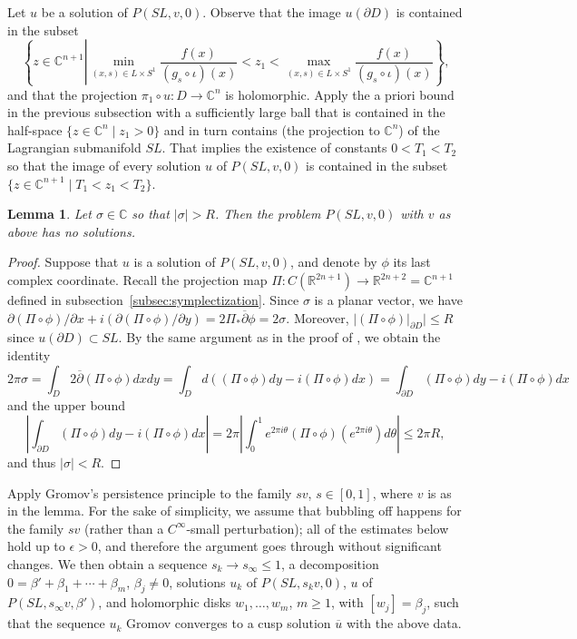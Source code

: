 \documentclass{amsart}
\newtheorem{lem}[thm]{Lemma}
\theoremstyle{remark}
\def\C{{\mathbb C}}
\def\p{{\partial}}
\def\pbar{{\overline{\partial}}}
\def\R{{\mathbb R}}
\begin{document}
Let $u$ be a solution of $P (SL, v, 0)$.
Observe that the image $u (\partial D)$ is contained in the subset
\[ \left\{ z \in \C^{n + 1} \left| \min_{(x,s) \in L \times S^1} \frac{f (x)}{(g_s \circ \iota) (x)} < z_1 < \max_{(x,s) \in L \times S^1} \frac{f (x)}{(g_s \circ \iota) (x)} \right. \right\}, \]
and that the projection $\pi_1 \circ u \colon D \to \C^n$ is holomorphic.
Apply the a priori bound in the previous subsection with a sufficiently large ball that is contained in the half-space $\{ z \in \C^n \mid z_1 > 0 \}$ and in turn contains (the projection to $\C^n$) of the Lagrangian submanifold $SL$.
That implies the existence of constants $0 < T_1 < T_2$ so that the image of every solution $u$ of $P (SL, v, 0)$ is contained in the subset $\{ z \in \C^{n + 1} \mid T_1 < z_1 < T_2 \}$.

\begin{lem}
Let $\sigma \in \C$ so that $| \sigma | > R$.
Then the problem $P (SL, v, 0)$ with $v$ as above has no solutions.
\end{lem}

\begin{proof}
Suppose that $u$ is a solution of $P (SL, v, 0)$, and denote by $\phi$ its last complex coordinate.
Recall the projection map $\Pi \colon C(\R^{2 n + 1}) \to \R^{2 n + 2} = \C^{n + 1}$ defined in subsection~\ref{subsec:symplectization}.
Since $\sigma$ is a planar vector, we have $\p (\Pi \circ \phi) / \p x + i (\p (\Pi \circ \phi) / \p y) = 2 \Pi_* \pbar \phi = 2 \sigma$.
Moreover, $| (\Pi \circ \phi) |_{\p D} | \le R$ since $u (\p D) \subset SL$.
By the same argument as in the proof of \cite[Lemma~4.3.A]{polterovich:ggs01}, we obtain the identity
\[ 2 \pi \sigma = \int_D 2 \pbar (\Pi \circ \phi) dx dy = \int_D d ((\Pi \circ \phi) dy - i (\Pi \circ \phi) dx) = \int_{\p D} (\Pi \circ \phi) dy - i (\Pi \circ \phi) dx \]
and the upper bound
\[ \left| \int_{\p D} (\Pi \circ \phi) dy - i (\Pi \circ \phi) dx \right| = 2 \pi \left| \int_0^1 e^{2 \pi i \theta} (\Pi \circ \phi) (e^{2 \pi i \theta}) d\theta \right| \le 2 \pi R, \]
and thus $| \sigma | < R$.
\end{proof}

Apply Gromov's persistence principle to the family $s v$, $s \in [0, 1]$, where $v$ is as in the lemma.
For the sake of simplicity, we assume that bubbling off happens for the family $s v$ (rather than a $C^\infty$-small perturbation); all of the estimates below hold up to $\epsilon > 0$, and therefore the argument goes through without significant changes.
We then obtain a sequence $s_k \to s_\infty \le 1$, a decomposition $0 = \beta' + \beta_1 + \cdots + \beta_m$, $\beta_j \not= 0$, solutions $u_k$ of $P (SL, s_k v, 0)$, $u$ of $P (SL, s_\infty v, \beta')$, and holomorphic disks $w_1, \ldots, w_m$, $m \ge 1$, with $[ w_j ] = \beta_j$, such that the sequence $u_k$ Gromov converges to a cusp solution $\overline{u}$ with the above data.
\end{document}
